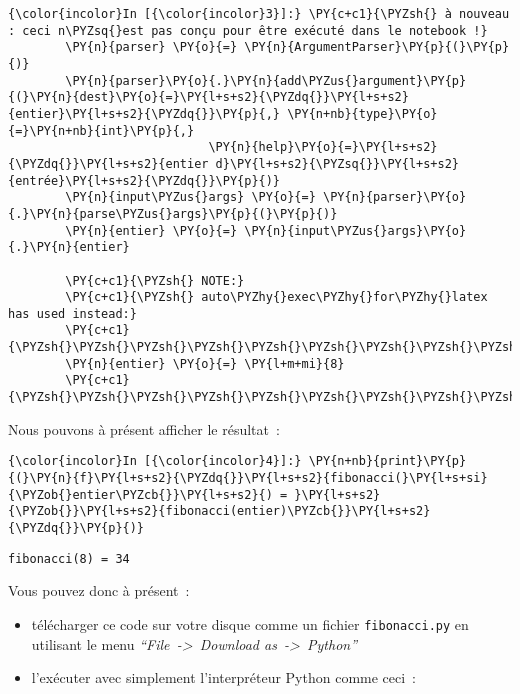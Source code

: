     \begin{Verbatim}[commandchars=\\\{\},frame=single,framerule=0.3mm,rulecolor=\color{cellframecolor}]
{\color{incolor}In [{\color{incolor}3}]:} \PY{c+c1}{\PYZsh{} à nouveau : ceci n\PYZsq{}est pas conçu pour être exécuté dans le notebook !}
        \PY{n}{parser} \PY{o}{=} \PY{n}{ArgumentParser}\PY{p}{(}\PY{p}{)}
        \PY{n}{parser}\PY{o}{.}\PY{n}{add\PYZus{}argument}\PY{p}{(}\PY{n}{dest}\PY{o}{=}\PY{l+s+s2}{\PYZdq{}}\PY{l+s+s2}{entier}\PY{l+s+s2}{\PYZdq{}}\PY{p}{,} \PY{n+nb}{type}\PY{o}{=}\PY{n+nb}{int}\PY{p}{,}
                            \PY{n}{help}\PY{o}{=}\PY{l+s+s2}{\PYZdq{}}\PY{l+s+s2}{entier d}\PY{l+s+s2}{\PYZsq{}}\PY{l+s+s2}{entrée}\PY{l+s+s2}{\PYZdq{}}\PY{p}{)}
        \PY{n}{input\PYZus{}args} \PY{o}{=} \PY{n}{parser}\PY{o}{.}\PY{n}{parse\PYZus{}args}\PY{p}{(}\PY{p}{)}
        \PY{n}{entier} \PY{o}{=} \PY{n}{input\PYZus{}args}\PY{o}{.}\PY{n}{entier}
        
        \PY{c+c1}{\PYZsh{} NOTE:}
        \PY{c+c1}{\PYZsh{} auto\PYZhy{}exec\PYZhy{}for\PYZhy{}latex has used instead:}
        \PY{c+c1}{\PYZsh{}\PYZsh{}\PYZsh{}\PYZsh{}\PYZsh{}\PYZsh{}\PYZsh{}\PYZsh{}\PYZsh{}\PYZsh{}}
        \PY{n}{entier} \PY{o}{=} \PY{l+m+mi}{8}
        \PY{c+c1}{\PYZsh{}\PYZsh{}\PYZsh{}\PYZsh{}\PYZsh{}\PYZsh{}\PYZsh{}\PYZsh{}\PYZsh{}\PYZsh{}}
\end{Verbatim}


    Nous pouvons à présent afficher le résultat~:

    \begin{Verbatim}[commandchars=\\\{\},frame=single,framerule=0.3mm,rulecolor=\color{cellframecolor}]
{\color{incolor}In [{\color{incolor}4}]:} \PY{n+nb}{print}\PY{p}{(}\PY{n}{f}\PY{l+s+s2}{\PYZdq{}}\PY{l+s+s2}{fibonacci(}\PY{l+s+si}{\PYZob{}entier\PYZcb{}}\PY{l+s+s2}{) = }\PY{l+s+s2}{\PYZob{}}\PY{l+s+s2}{fibonacci(entier)\PYZcb{}}\PY{l+s+s2}{\PYZdq{}}\PY{p}{)}
\end{Verbatim}


    \begin{Verbatim}[commandchars=\\\{\},frame=single,framerule=0.3mm,rulecolor=\color{cellframecolor}]
fibonacci(8) = 34
\end{Verbatim}

    Vous pouvez donc à présent~:

\begin{itemize}
\tightlist
\item
  télécharger ce code sur votre disque comme un fichier
  \texttt{fibonacci.py} en utilisant le menu
  \emph{``File~-\textgreater{}~Download as~-\textgreater{}~Python''}
\item
  l'exécuter avec simplement l'interpréteur Python comme ceci~:
\end{itemize}

\begin{Shaded}
\begin{Highlighting}[frame=lines,framerule=0.6mm,rulecolor=\color{asisframecolor}]
\NormalTok{$ }
\end{Highlighting}
\end{Shaded}


    
    
    
